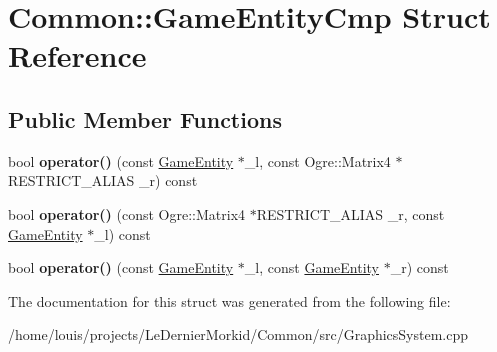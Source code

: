 \hypertarget{struct_common_1_1_game_entity_cmp}{}\section{Common\+:\+:Game\+Entity\+Cmp Struct Reference}
\label{struct_common_1_1_game_entity_cmp}
\subsection*{Public Member Functions}
\begin{DoxyCompactItemize}
\item 
\mbox{\label{struct_common_1_1_game_entity_cmp_ab4e0547cba2304e3eefe3e6568df678d}} 
bool {\bfseries operator()} (const \hyperlink{struct_common_1_1_game_entity}{Game\+Entity} $\ast$\+\_\+l, const Ogre\+::\+Matrix4 $\ast$R\+E\+S\+T\+R\+I\+C\+T\+\_\+\+A\+L\+I\+AS \+\_\+r) const
\item 
\mbox{\label{struct_common_1_1_game_entity_cmp_acc6e1674ddc34ae8992b38c9a2b04e31}} 
bool {\bfseries operator()} (const Ogre\+::\+Matrix4 $\ast$R\+E\+S\+T\+R\+I\+C\+T\+\_\+\+A\+L\+I\+AS \+\_\+r, const \hyperlink{struct_common_1_1_game_entity}{Game\+Entity} $\ast$\+\_\+l) const
\item 
\mbox{\label{struct_common_1_1_game_entity_cmp_adb326666aef6ac6279d3d11eb679ceee}} 
bool {\bfseries operator()} (const \hyperlink{struct_common_1_1_game_entity}{Game\+Entity} $\ast$\+\_\+l, const \hyperlink{struct_common_1_1_game_entity}{Game\+Entity} $\ast$\+\_\+r) const
\end{DoxyCompactItemize}


The documentation for this struct was generated from the following file\+:\begin{DoxyCompactItemize}
\item 
/home/louis/projects/\+Le\+Dernier\+Morkid/\+Common/src/Graphics\+System.\+cpp\end{DoxyCompactItemize}
